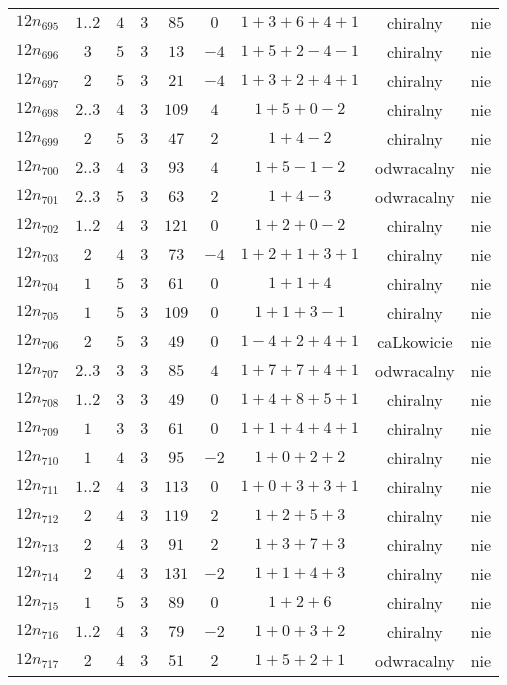 \begin{longtable}{ccccccccc}
$12n_{695}$ & $1..2$ & $4$ & $3$ & $85$ & $0$ & $1+3+6+4+1$ & chiralny & nie \\
$12n_{696}$ & $3$ & $5$ & $3$ & $13$ & $-4$ & $1+5+2-4-1$ & chiralny & nie \\
$12n_{697}$ & $2$ & $5$ & $3$ & $21$ & $-4$ & $1+3+2+4+1$ & chiralny & nie \\
$12n_{698}$ & $2..3$ & $4$ & $3$ & $109$ & $4$ & $1+5+0-2$ & chiralny & nie \\
$12n_{699}$ & $2$ & $5$ & $3$ & $47$ & $2$ & $1+4-2$ & chiralny & nie \\
$12n_{700}$ & $2..3$ & $4$ & $3$ & $93$ & $4$ & $1+5-1-2$ & odwracalny & nie \\
$12n_{701}$ & $2..3$ & $5$ & $3$ & $63$ & $2$ & $1+4-3$ & odwracalny & nie \\
$12n_{702}$ & $1..2$ & $4$ & $3$ & $121$ & $0$ & $1+2+0-2$ & chiralny & nie \\
$12n_{703}$ & $2$ & $4$ & $3$ & $73$ & $-4$ & $1+2+1+3+1$ & chiralny & nie \\
$12n_{704}$ & $1$ & $5$ & $3$ & $61$ & $0$ & $1+1+4$ & chiralny & nie \\
$12n_{705}$ & $1$ & $5$ & $3$ & $109$ & $0$ & $1+1+3-1$ & chiralny & nie \\
$12n_{706}$ & $2$ & $5$ & $3$ & $49$ & $0$ & $1-4+2+4+1$ & caLkowicie & nie \\
$12n_{707}$ & $2..3$ & $3$ & $3$ & $85$ & $4$ & $1+7+7+4+1$ & odwracalny & nie \\
$12n_{708}$ & $1..2$ & $3$ & $3$ & $49$ & $0$ & $1+4+8+5+1$ & chiralny & nie \\
$12n_{709}$ & $1$ & $3$ & $3$ & $61$ & $0$ & $1+1+4+4+1$ & chiralny & nie \\
$12n_{710}$ & $1$ & $4$ & $3$ & $95$ & $-2$ & $1+0+2+2$ & chiralny & nie \\
$12n_{711}$ & $1..2$ & $4$ & $3$ & $113$ & $0$ & $1+0+3+3+1$ & chiralny & nie \\
$12n_{712}$ & $2$ & $4$ & $3$ & $119$ & $2$ & $1+2+5+3$ & chiralny & nie \\
$12n_{713}$ & $2$ & $4$ & $3$ & $91$ & $2$ & $1+3+7+3$ & chiralny & nie \\
$12n_{714}$ & $2$ & $4$ & $3$ & $131$ & $-2$ & $1+1+4+3$ & chiralny & nie \\
$12n_{715}$ & $1$ & $5$ & $3$ & $89$ & $0$ & $1+2+6$ & chiralny & nie \\
$12n_{716}$ & $1..2$ & $4$ & $3$ & $79$ & $-2$ & $1+0+3+2$ & chiralny & nie \\
$12n_{717}$ & $2$ & $4$ & $3$ & $51$ & $2$ & $1+5+2+1$ & odwracalny & nie \\

\end{longtable}
